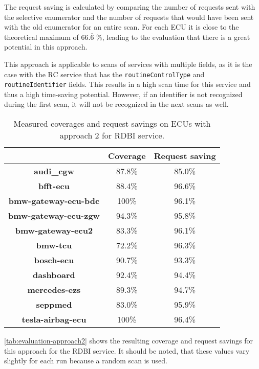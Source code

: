 The request saving is calculated by comparing the number of requests sent with the selective enumerator and the number of requests that would have been sent with the old enumerator for an entire scan. For each ECU it is close to the theoretical maximum of $66.\overline{6}$ \%, leading to the evaluation that there is a great potential in this approach.

This approach is applicable to scans of services with multiple fields, as it is the case with the RC service that has the \texttt{routineControlType} and \texttt{routineIdentifier} fields. This results in a high scan time for this service and thus a high time-saving potential. However, if an identifier is not recognized during the first scan, it will not be recognized in the next scans as well.



\begin{table}[h]
    \begin{center}
    \begin{tabular}{ccc}
        \hline
        & \textbf{Coverage} & \textbf{Request saving} \\
        \hline
        \textbf{audi\_cgw} & 87.8\% & 85.0\% \\
        \textbf{bfft-ecu} & 88.4\% & 96.6\% \\
        \textbf{bmw-gateway-ecu-bdc} & 100\% & 96.1\% \\
        \textbf{bmw-gateway-ecu-zgw} & 94.3\% & 95.8\% \\
        \textbf{bmw-gateway-ecu2} & 83.3\% & 96.1\% \\
        \textbf{bmw-tcu} & 72.2\% & 96.3\% \\
        \textbf{bosch-ecu} & 90.7\% & 93.3\% \\
        \textbf{dashboard} & 92.4\% & 94.4\% \\
        \textbf{mercedes-ezs} & 89.3\% & 94.7\% \\
        \textbf{seppmed} & 83.0\% & 95.9\% \\
        \textbf{tesla-airbag-ecu} & 100\% & 96.4\% \\
        \hline
    \end{tabular}
    \end{center}
    \caption{Measured coverages and request savings on ECUs with approach 2 for RDBI service.}
    \label{tab:evaluation-approach2}
\end{table}

\autoref{tab:evaluation-approach2} shows the resulting coverage and request savings for this approach for the RDBI service. It should be noted, that these values vary slightly for each run because a random scan is used.

